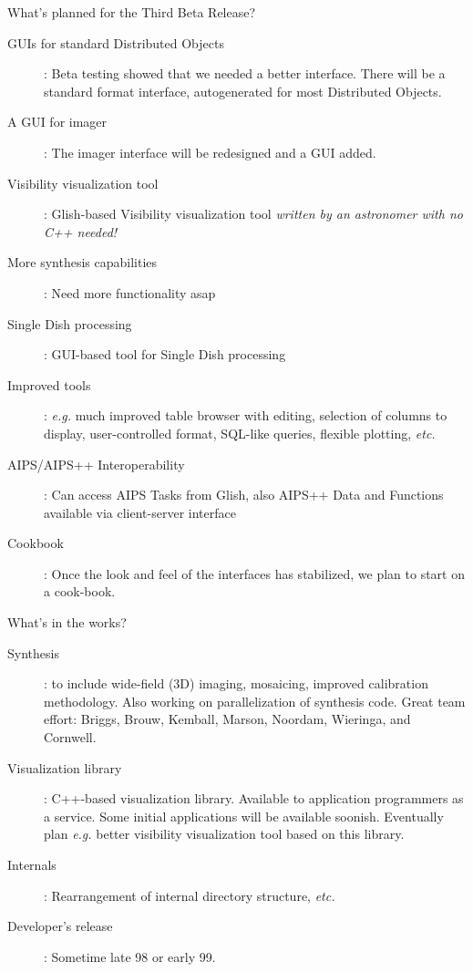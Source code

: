 \begin{slide}{What's planned for the Third Beta Release?}
\begin{description}
\item[GUIs for standard Distributed Objects]: Beta testing showed that
we needed a better interface. There will be a standard format interface,
autogenerated for most Distributed Objects.
\item[A GUI for imager]: The imager interface will be redesigned
and a GUI added.
\item[Visibility visualization tool]: Glish-based Visibility visualization
tool {\em written by an astronomer with no C++ needed!}
\item[More synthesis capabilities]: Need more functionality asap
\item[Single Dish processing]: GUI-based tool for Single Dish processing
\item[Improved tools]: {\em e.g.} much improved table browser with editing,
selection of columns to display, user-controlled format, SQL-like queries,
flexible plotting, {\em etc.}
\item[AIPS/AIPS++ Interoperability]: Can access AIPS Tasks from Glish,
also AIPS++ Data and Functions available via client-server interface
\item[Cookbook]: Once the look and feel of the interfaces has stabilized,
we plan to start on a cook-book.
\end{description}
\end{slide}

\begin{slide}{What's in the works?}
\begin{description}
\item[Synthesis]: to include wide-field (3D) imaging, mosaicing, improved
calibration methodology. Also working on parallelization of synthesis code.
Great team effort: Briggs, Brouw, Kemball, Marson, Noordam, Wieringa, and 
Cornwell.
\item[Visualization library]: C++-based visualization library. Available
to application programmers as a service. Some initial applications will
be available soonish. Eventually plan {\em e.g.} better visibility
visualization tool based on this library.
\item[Internals]: Rearrangement of internal directory structure, {\em etc.}
\item[Developer's release]: Sometime late 98 or early 99.
\end{description}
\end{slide}

